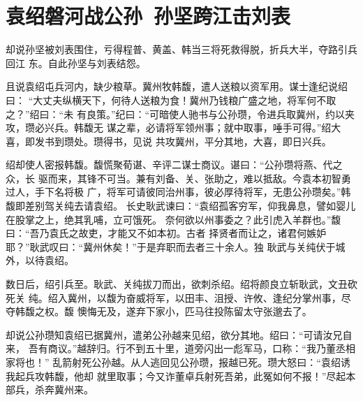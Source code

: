 \chapter{袁绍磐河战公孙~孙坚跨江击刘表}

却说孙坚被刘表围住，亏得程普、黄盖、韩当三将死救得脱，折兵大半，夺路引兵回江
东。自此孙坚与刘表结怨。

且说袁绍屯兵河内，缺少粮草。冀州牧韩馥，遣人送粮以资军用。谋士逢纪说绍曰：
“大丈夫纵横天下，何待人送粮为食！冀州乃钱粮广盛之地，将军何不取之？”绍曰：“未
有良策。”纪曰：“可暗使人驰书与公孙瓒，令进兵取冀州，约以夹攻，瓒必兴兵。韩馥无
谋之辈，必请将军领州事；就中取事，唾手可得。”绍大喜，即发书到瓒处。瓒得书，见说
共攻冀州，平分其地，大喜，即日兴兵。

绍却使人密报韩馥。馥慌聚荀谌、辛评二谋士商议。谌曰：“公孙瓒将燕、代之众，长
驱而来，其锋不可当。兼有刘备、关、张助之，难以抵敌。今袁本初智勇过人，手下名将极
广，将军可请彼同治州事，彼必厚待将军，无患公孙瓒矣。”韩馥即差别驾关纯去请袁绍。
长史耿武谏曰：“袁绍孤客穷军，仰我鼻息，譬如婴儿在股掌之上，绝其乳哺，立可饿死。
奈何欲以州事委之？此引虎入羊群也。”馥曰：“吾乃袁氏之故吏，才能又不如本初。古者
择贤者而让之，诸君何嫉妒耶？”耿武叹曰：“冀州休矣！”于是弃职而去者三十余人。独
耿武与关纯伏于城外，以待袁绍。

数日后，绍引兵至。耿武、关纯拔刀而出，欲刺杀绍。绍将颜良立斩耿武，文丑砍死关
纯。绍入冀州，以馥为奋威将军，以田丰、沮授、许攸、逢纪分掌州事，尽夺韩馥之权。馥
懊悔无及，遂弃下家小，匹马往投陈留太守张邈去了。

却说公孙瓒知袁绍已据冀州，遣弟公孙越来见绍，欲分其地。绍曰：“可请汝兄自来，
吾有商议。”越辞归。行不到五十里，道旁闪出一彪军马，口称：“我乃董丞相家将也！”
乱箭射死公孙越。从人逃回见公孙瓒，报越已死。瓒大怒曰：“袁绍诱我起兵攻韩馥，他却
就里取事；今又诈董卓兵射死吾弟，此冤如何不报！”尽起本部兵，杀奔冀州来。

